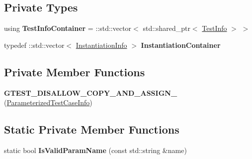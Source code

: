 \subsection*{Private Types}
\begin{DoxyCompactItemize}
\item 
\mbox{\label{classtesting_1_1internal_1_1_parameterized_test_case_info_acf046d18ef05ec704cfac856e39dc181}} 
using {\bfseries Test\+Info\+Container} = \+::std\+::vector$<$ std\+::shared\+\_\+ptr$<$ \mbox{\hyperlink{structtesting_1_1internal_1_1_parameterized_test_case_info_1_1_test_info}{Test\+Info}} $>$ $>$
\item 
\mbox{\label{classtesting_1_1internal_1_1_parameterized_test_case_info_acf93d7726e6d55e312ac89c51379110c}} 
typedef \+::std\+::vector$<$ \mbox{\hyperlink{structtesting_1_1internal_1_1_parameterized_test_case_info_1_1_instantiation_info}{Instantiation\+Info}} $>$ {\bfseries Instantiation\+Container}
\end{DoxyCompactItemize}
\subsection*{Private Member Functions}
\begin{DoxyCompactItemize}
\item 
\mbox{\label{classtesting_1_1internal_1_1_parameterized_test_case_info_a838031a1ebad654ac47be69ec5ec3f0a}} 
{\bfseries G\+T\+E\+S\+T\+\_\+\+D\+I\+S\+A\+L\+L\+O\+W\+\_\+\+C\+O\+P\+Y\+\_\+\+A\+N\+D\+\_\+\+A\+S\+S\+I\+G\+N\+\_\+} (\mbox{\hyperlink{classtesting_1_1internal_1_1_parameterized_test_case_info}{Parameterized\+Test\+Case\+Info}})
\end{DoxyCompactItemize}
\subsection*{Static Private Member Functions}
\begin{DoxyCompactItemize}
\item 
\mbox{\label{classtesting_1_1internal_1_1_parameterized_test_case_info_a2e5ef36510c01934c07889a5f60e9ed8}} 
static bool {\bfseries Is\+Valid\+Param\+Name} (const std\+::string \&name)
\end{DoxyCompactItemize}
